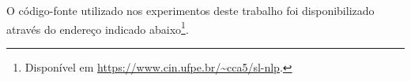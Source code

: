 O código-fonte utilizado nos experimentos deste trabalho foi disponibilizado através do endereço indicado abaixo\footnote{
    Disponível em \url{https://www.cin.ufpe.br/~cca5/sl-nlp}.
}.













